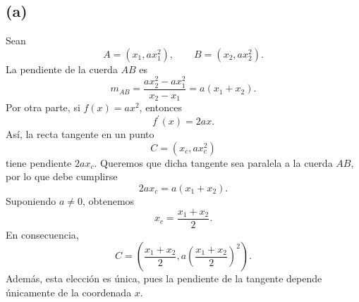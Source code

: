 \documentclass[12pt,a4paper]{article}
\newcommand{\paren}[1]{\left( #1 \right)}
\begin{document}
    \begin{solucion}
        \subsection*{(a)}
        Sean
        \begin{equation*}
            A=(x_{1},ax_{1}^{2}),\qquad B=(x_{2},ax_{2}^{2}).
        \end{equation*}
        La pendiente de la cuerda $AB$ es
        \begin{equation*}
            m_{AB}=\frac{ax_{2}^{2}-ax_{1}^{2}}{x_{2}-x_{1}}=a(x_{1}+x_{2}).
        \end{equation*}
        Por otra parte, si $f(x)=ax^{2}$, entonces
        \begin{equation*}
            f^{\prime}(x)=2ax.
        \end{equation*}
        Así, la recta tangente en un punto
        \begin{equation*}
            C=(x_{c},ax_{c}^{2})
        \end{equation*}
        tiene pendiente $2ax_{c}$. Queremos que dicha tangente sea paralela a la cuerda $AB$,
        por lo que debe cumplirse
        \begin{equation*}
            2ax_{c}=a(x_{1}+x_{2}).
        \end{equation*}
        Suponiendo $a\neq0$, obtenemos
        \begin{equation*}
            x_{c}=\frac{x_{1}+x_{2}}{2}.
        \end{equation*}
        En consecuencia,
        \begin{equation*}
            C=\paren{\frac{x_{1}+x_{2}}{2},a\paren{\frac{x_{1}+x_{2}}{2}}^{2}}.
        \end{equation*}
        Además, esta elección es única, pues la pendiente de la tangente depende únicamente
        de la coordenada $x$.


\end{solucion}
\end{document}
